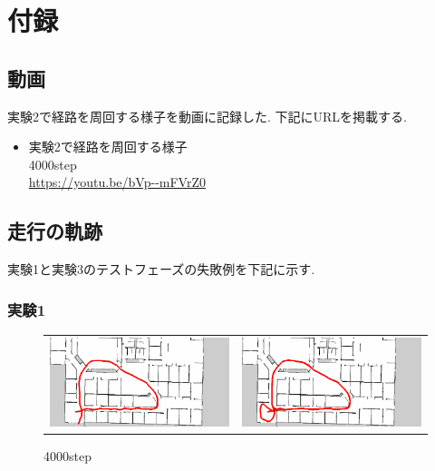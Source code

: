 \chapter*{付録}
\section*{動画}
実験2で経路を周回する様子を動画に記録した. 下記にURLを掲載する.
\begin{itemize}
  \item 実験2で経路を周回する様子 \\ 4000step \\ \url{https://youtu.be/bVp--mFVrZ0}
\end{itemize}

\newpage
\section*{走行の軌跡}
実験1と実験3のテストフェーズの失敗例を下記に示す.
\subsection*{実験1}

\begin{figure}[h]
  \begin{tabular}{cc}
    \begin{minipage}[h]{0.45\hsize}
      \centering
      \includegraphics[keepaspectratio, scale=0.3]{images/exp1.2_4000_2.png}
    \end{minipage} &
    \begin{minipage}[h]{0.45\hsize}
      \centering
      \includegraphics[keepaspectratio, scale=0.3]{images/exp1.2_4000_8.png}
    \end{minipage} \\
  \end{tabular}
   \caption*{4000step}
\end{figure}

